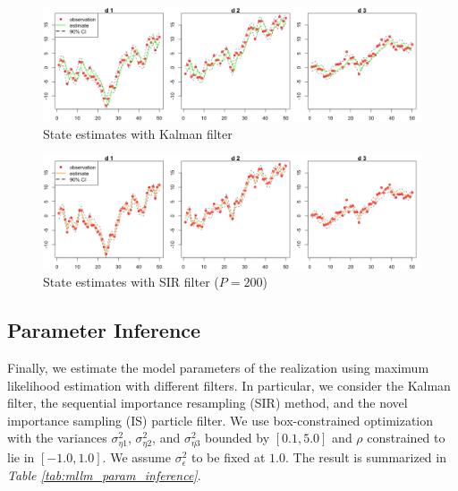\documentclass[11pt, oneside]{scrreprt}   	%
\begin{document}
\begin{figure}[h!]
\centering
\includegraphics[width=155mm]{../../images/mllm-estimate-kalman.png}
\caption{State estimates with Kalman filter}
\label{fig:mllm_estimate_kalman}
\end{figure}

\begin{figure}[h!]
\centering
\includegraphics[width=155mm]{../../images/mllm-estimate-sir.png}
\caption{State estimates with SIR filter ($P=200$)}
\label{fig:mllm_estimate_sir}
\end{figure}

\subsection{Parameter Inference}
Finally, we estimate the model parameters of the realization using maximum likelihood estimation with different filters. In particular, we consider the Kalman filter, the sequential importance resampling (SIR) method, and the novel importance sampling (IS) particle filter. We use box-constrained optimization with the variances $\sigma_{\eta 1}^2$,  $\sigma_{\eta 2}^2$, and $\sigma_{\eta 3}^2$ bounded by $[0.1,5.0]$ and  $\rho$ constrained to lie in $[-1.0, 1.0]$. We assume $\sigma_{\epsilon}^2$ to be fixed at $1.0$. The result is summarized in \textit{Table \ref{tab:mllm_param_inference}}.\\  
\end{document}
